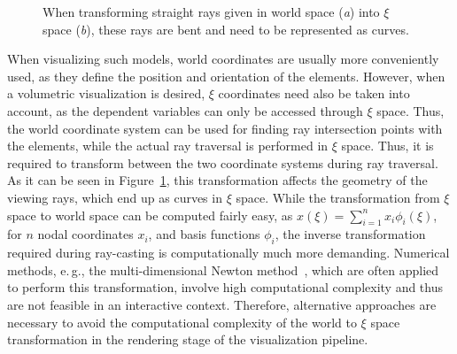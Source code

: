 \documentclass[review,journal]{vgtc}         %
\begin{document}
\begin{figure}[t]
    \centering
    \hspace*{0.5cm}
    \caption{When transforming straight rays given in world space ({\it a}) into $\xi$ space ({\it b}), these rays are bent and need to be represented as curves.}
    \label{fig:raycoords}
\end{figure}

When visualizing such models, world coordinates are usually more conveniently used, as they define the position and orientation of the elements. However, when a volumetric visualization is desired, $\xi$ coordinates need also be taken into account, as the dependent variables can only be accessed through $\xi$ space. Thus, the world coordinate system can be used for finding ray intersection points with the elements, while the actual ray traversal is performed in $\xi$ space. Thus, it is required to transform between the two coordinate systems during ray traversal. As it can be seen in Figure~\ref{fig:raycoords}, this transformation affects the geometry of the viewing rays, which end up as curves in $\xi$ space. While the transformation from $\xi$ space to world space can be computed fairly easy, as $x(\xi)=\sum_{i=1}^n x_i \phi_i(\xi)$, for $n$ nodal coordinates $x_i$, and basis functions $\phi_i$, the inverse transformation required during ray-casting is computationally much more demanding. Numerical methods, e.\,g., the multi-dimensional Newton method~\cite{Press92}, which are often applied to perform this transformation, involve high computational complexity and thus are not feasible in an interactive context. Therefore, alternative approaches are necessary to avoid the computational complexity of the world to $\xi$ space transformation in the rendering stage of the visualization pipeline.
\end{document}
